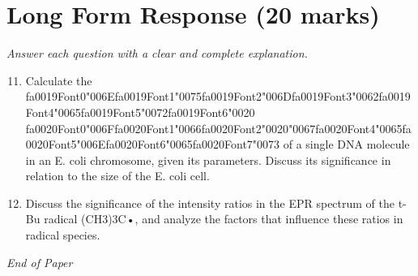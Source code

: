 \documentclass[12pt]{article}
\begin{document}
\section*{Long Form Response (20 marks)}
\textit{Answer each question with a clear and complete explanation.}
\begin{enumerate}[label=\arabic*.]
\setcounter{enumi}{10}
\item Calculate the {\csname fa0019Font0\endcsname\char"006E}{\csname fa0019Font1\endcsname\char"0075}{\csname fa0019Font2\endcsname\char"006D}{\csname fa0019Font3\endcsname\char"0062}{\csname fa0019Font4\endcsname\char"0065}{\csname fa0019Font5\endcsname\char"0072}{\csname fa0019Font6\endcsname\char"0020} {\csname fa0020Font0\endcsname\char"006F}{\csname fa0020Font1\endcsname\char"0066}{\csname fa0020Font2\endcsname\char"0020}{\char"0067}{\csname fa0020Font4\endcsname\char"0065}{\csname fa0020Font5\endcsname\char"006E}{\csname fa0020Font6\endcsname\char"0065}{\csname fa0020Font7\endcsname\char"0073} of a single DNA molecule in an E. coli chromosome, given its
parameters. Discuss its significance in relation to the size of the E. coli cell.
\item Discuss the significance of the intensity ratios in the EPR spectrum of the t-Bu radical
(CH3)3C•, and analyze the factors that influence these ratios in radical species.
\end{enumerate}

\vfill
\noindent\textit{End of Paper}
\end{document}
